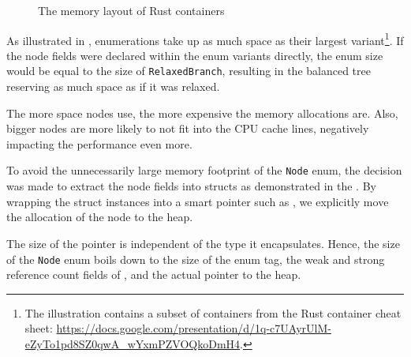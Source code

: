 \begin{figure}[!ht]

    \caption{The memory layout of Rust containers}
    \label{fig:memory-layout-of-rust-containers}
\end{figure}

As illustrated in , enumerations take up as much space as their largest variant\footnote{The illustration contains a subset of containers from the Rust container cheat sheet: \url{https://docs.google.com/presentation/d/1q-c7UAyrUlM-eZyTo1pd8SZ0qwA_wYxmPZVOQkoDmH4}.}. If the node fields were declared within the enum variants directly, the enum size would be equal to the size of \texttt{RelaxedBranch}, resulting in the balanced tree reserving as much space as if it was relaxed.

The more space nodes use, the more expensive the memory allocations are. Also, bigger nodes are more likely to not fit into the CPU cache lines, negatively impacting the performance even more.

To avoid the unnecessarily large memory footprint of the \texttt{Node} enum, the decision was made to extract the node fields into structs as demonstrated in the . By wrapping the struct instances into a smart pointer such as \rc{}, we explicitly move the allocation of the node to the heap.

The size of the \rc{} pointer is independent of the type it encapsulates. Hence, the size of the \texttt{Node} enum boils down to the size of the enum tag, the weak and strong reference count fields of \rc{}, and the actual pointer to the heap.

